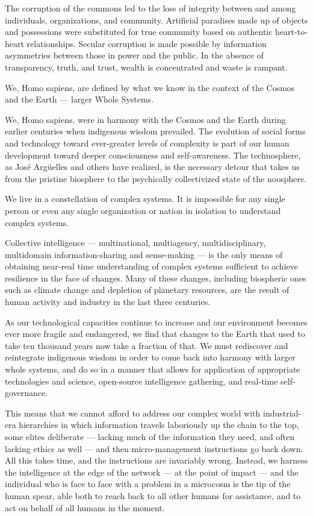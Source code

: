 \documentclass[letterpaper,12pt,english]{sphinxmanual}
\begin{document}
The corruption of the commons led to the loss of integrity between and among individuals, organizations, and community. Artificial paradises made up of objects and possessions were substituted for true community based on authentic heart-to-heart relationships. Secular corruption is made possible by information asymmetries between those in power and the public. In the absence of transparency, truth, and trust, wealth is concentrated and waste is rampant.

We, Homo sapiens, are defined by what we know in the context of the Cosmos and the Earth — larger Whole Systems.

We, Homo sapiens, were in harmony with the Cosmos and the Earth during earlier centuries when indigenous wisdom prevailed. The evolution of social forms and technology toward ever-greater levels of complexity is part of our human development toward deeper consciousness and self-awareness. The technosphere, as José Argüelles and others have realized, is the necessary detour that takes us from the pristine biosphere to the psychically collectivized state of the noosphere.

We live in a constellation of complex systems. It is impossible for any single person or even any single organization or nation in isolation to understand complex systems.

Collective intelligence — multinational, multiagency, multidisciplinary, multidomain information-sharing and sense-making — is the only means of obtaining near-real time understanding of complex systems sufficient to achieve resilience in the face of changes. Many of these changes, including biospheric ones such as climate change and depletion of planetary resources, are the result of human activity and industry in the last three centuries.

As our technological capacities continue to increase and our environment becomes ever more fragile and endangered, we find that changes to the Earth that used to take ten thousand years now take a fraction of that. We must rediscover and reintegrate indigenous wisdom in order to come back into harmony with larger whole systems, and do so in a manner that allows for application of appropriate technologies and science, open-source intelligence gathering, and real-time self-governance.

This means that we cannot afford to address our complex world with industrial-era hierarchies in which information travels laboriously up the chain to the top, some elites deliberate — lacking much of the information they need, and often lacking ethics as well — and then micro-management instructions go back down. All this takes time, and the instructions are invariably wrong. Instead, we harness the intelligence at the edge of the network — at the point of impact — and the individual who is face to face with a problem in a microcosm is the tip of the human spear, able both to reach back to all other humans for assistance, and to act on behalf of all humans in the moment.
\end{document}
